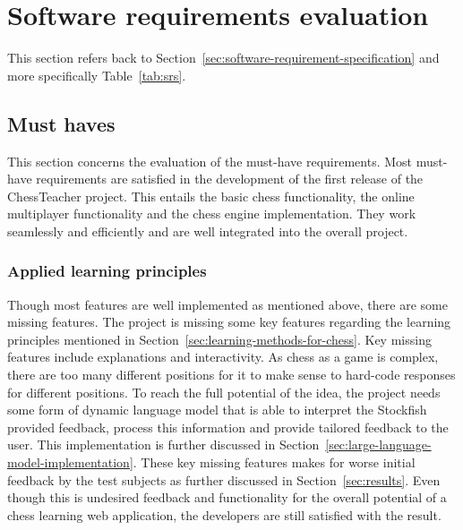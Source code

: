 \section{Software requirements evaluation}\label{sec:software-requirements-evaluation}

This section refers back to Section~\ref{sec:software-requirement-specification} and more specifically
Table~\ref{tab:srs}.

\subsection{Must haves}\label{subsec:must-haves}

This section concerns the evaluation of the must-have requirements.
Most must-have requirements are satisfied in the development of the first release of the ChessTeacher project.
This entails the basic chess functionality, the online multiplayer functionality and the chess engine implementation.
They work seamlessly and efficiently and are well integrated into the overall project.

\subsubsection{Applied learning principles}

Though most features are well implemented as mentioned above, there are some missing features.
The project is missing some key features regarding the learning principles mentioned in
Section~\ref{sec:learning-methods-for-chess}.
Key missing features include explanations and interactivity.
As chess as a game is complex, there are too many different positions for it to make sense to hard-code responses for
different positions.
To reach the full potential of the idea, the project needs some form of dynamic language model that is able to interpret
the Stockfish provided feedback, process this information and provide tailored feedback to the user.
This implementation is further discussed in Section~\ref{sec:large-language-model-implementation}.
These key missing features makes for worse initial feedback by the test subjects as further discussed in
Section~\ref{sec:results}.
Even though this is undesired feedback and functionality for the overall potential of a chess learning web
application, the developers are still satisfied with the result.

